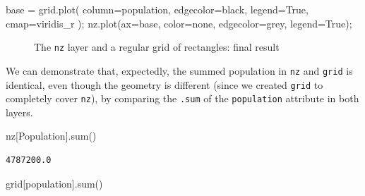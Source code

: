 \documentclass[
  letterpaper,
]{krantz}
\newenvironment{Shaded}{\begin{snugshade}}{\end{snugshade}}
\newcommand{\BuiltInTok}[1]{\textcolor[rgb]{0.00,0.23,0.31}{#1}}
\newcommand{\NormalTok}[1]{\textcolor[rgb]{0.00,0.23,0.31}{#1}}
\newcommand{\OperatorTok}[1]{\textcolor[rgb]{0.37,0.37,0.37}{#1}}
\newcommand{\StringTok}[1]{\textcolor[rgb]{0.13,0.47,0.30}{#1}}
\newcommand{\VariableTok}[1]{\textcolor[rgb]{0.07,0.07,0.07}{#1}}
\begin{document}
\begin{Shaded}
\begin{Highlighting}[]
\NormalTok{base }\OperatorTok{=}\NormalTok{ grid.plot(}
\NormalTok{    column}\OperatorTok{=}\StringTok{\textquotesingle{}population\textquotesingle{}}\NormalTok{, }
\NormalTok{    edgecolor}\OperatorTok{=}\StringTok{\textquotesingle{}black\textquotesingle{}}\NormalTok{,}
\NormalTok{    legend}\OperatorTok{=}\VariableTok{True}\NormalTok{, }
\NormalTok{    cmap}\OperatorTok{=}\StringTok{\textquotesingle{}viridis\_r\textquotesingle{}}
\NormalTok{)}\OperatorTok{;}
\NormalTok{nz.plot(ax}\OperatorTok{=}\NormalTok{base, color}\OperatorTok{=}\StringTok{\textquotesingle{}none\textquotesingle{}}\NormalTok{, edgecolor}\OperatorTok{=}\StringTok{\textquotesingle{}grey\textquotesingle{}}\NormalTok{, legend}\OperatorTok{=}\VariableTok{True}\NormalTok{)}\OperatorTok{;}
\end{Highlighting}
\end{Shaded}

\begin{figure}[H]


\caption{\label{fig-nz-and-grid3}The \texttt{nz} layer and a regular
grid of rectangles: final result}

\end{figure}%

We can demonstrate that, expectedly, the summed population in
\texttt{nz} and \texttt{grid} is identical, even though the geometry is
different (since we created \texttt{grid} to completely cover
\texttt{nz}), by comparing the \texttt{.sum} of the \texttt{population}
attribute in both layers.

\begin{Shaded}
\begin{Highlighting}[]
\NormalTok{nz[}\StringTok{\textquotesingle{}Population\textquotesingle{}}\NormalTok{].}\BuiltInTok{sum}\NormalTok{()}
\end{Highlighting}
\end{Shaded}

\begin{verbatim}
4787200.0
\end{verbatim}

\begin{Shaded}
\begin{Highlighting}[]
\NormalTok{grid[}\StringTok{\textquotesingle{}population\textquotesingle{}}\NormalTok{].}\BuiltInTok{sum}\NormalTok{()}
\end{Highlighting}
\end{Shaded}
\end{document}
